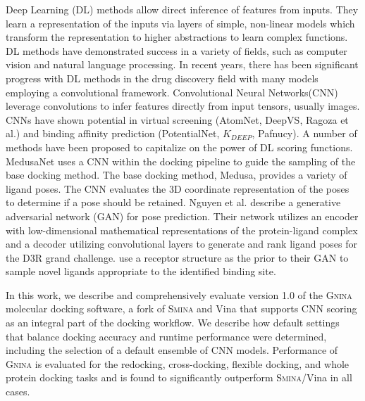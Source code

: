 \documentclass[journal=jcisd8,manuscript=article]{achemso}
\begin{document}
Deep Learning (DL) methods allow direct inference of features from inputs. They learn a representation of the inputs via layers of simple, non-linear models which transform the representation to higher abstractions to learn complex functions\cite{lecun2015deep}.  DL methods have demonstrated success in a variety of fields, such as computer vision and natural language processing\cite{krizhevsky2017imagenet,brown2020language}. In recent years, there has been significant progress with DL methods in the drug discovery field with many models employing a convolutional framework. Convolutional Neural Networks(CNN) leverage convolutions to infer features directly from input tensors, usually images. CNNs have shown potential in virtual screening (AtomNet\cite{wallach2015atomnet}, DeepVS\cite{pereira2016boosting}, Ragoza et al.\cite{Ragoza2017}) and binding affinity prediction (PotentialNet\cite{feinberg2018potentialnet}, $K_{DEEP}$\cite{jimenez2018k}, Pafnucy\cite{stepniewska2018development}). A number of methods have been proposed to capitalize on the power of DL scoring functions. MedusaNet uses a CNN within the docking pipeline to guide the sampling of the base docking method\cite{jiang2020guiding}. The base docking method, Medusa, provides a variety of ligand poses. The CNN evaluates the 3D coordinate representation of the poses to determine if a pose should be retained. Nguyen et al. \cite{nguyen2020mathdl} describe a generative adversarial network (GAN) for pose prediction. Their network utilizes an encoder with low-dimensional mathematical representations of the protein-ligand complex and a decoder utilizing convolutional layers to generate and rank ligand poses for the D3R grand challenge. \citet{masuda2020generating} use a receptor structure as the prior to their GAN to sample novel ligands appropriate to the identified binding site.

In this work, we describe and comprehensively evaluate version 1.0 of the \textsc{Gnina} molecular docking software, a fork of \textsc{Smina}\cite{koes2013lessons} and Vina\cite{trott2010autodock} that supports CNN scoring as an integral part of the docking workflow. We describe how default settings that balance docking accuracy and runtime performance were determined, including the selection of a default ensemble of CNN models. Performance of \textsc{Gnina} is evaluated for the redocking, cross-docking, flexible docking, and whole protein docking tasks and is found to significantly outperform \textsc{Smina}/Vina in all cases.
\end{document}
